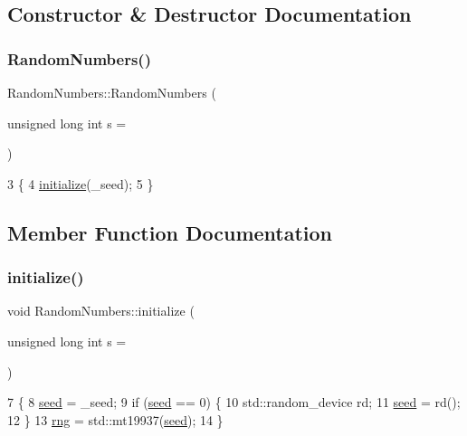 \subsection{Constructor \& Destructor Documentation}
\mbox{\label{classRandomNumbers_aeceac66b253ad00f58e7b2252f18f609}} 
\subsubsection{\texorpdfstring{Random\+Numbers()}{RandomNumbers()}}
{\footnotesize\ttfamily Random\+Numbers\+::\+Random\+Numbers (\begin{DoxyParamCaption}\item[{unsigned long int}]{s = {} }\end{DoxyParamCaption})}


\begin{DoxyCode}
3                                                     \{
4     \mbox{\hyperlink{classRandomNumbers_a9ee407185ec3f4e1a165edadb42c38e6}{initialize}}(\_seed);
5 \}
\end{DoxyCode}


\subsection{Member Function Documentation}
\mbox{\label{classRandomNumbers_a9ee407185ec3f4e1a165edadb42c38e6}} 
\subsubsection{\texorpdfstring{initialize()}{initialize()}}
{\footnotesize\ttfamily void Random\+Numbers\+::initialize (\begin{DoxyParamCaption}\item[{unsigned long int}]{s = {} }\end{DoxyParamCaption})}


\begin{DoxyCode}
7                                                       \{
8     \mbox{\hyperlink{classRandomNumbers_a83c563bc5ca60f2e5c149244b327d948}{seed}} = \_seed;
9     \textcolor{keywordflow}{if} (\mbox{\hyperlink{classRandomNumbers_a83c563bc5ca60f2e5c149244b327d948}{seed}} == 0) \{
10         std::random\_device rd;
11         \mbox{\hyperlink{classRandomNumbers_a83c563bc5ca60f2e5c149244b327d948}{seed}} = rd();
12     \}
13     \mbox{\hyperlink{classRandomNumbers_a15ceee85d6d00de12ae76c90aaec2f14}{rng}} = std::mt19937(\mbox{\hyperlink{classRandomNumbers_a83c563bc5ca60f2e5c149244b327d948}{seed}});
14 \}
\end{DoxyCode}
\mbox{\label{classRandomNumbers_a4ef5917200da65aa267735d389bdf995}} 
